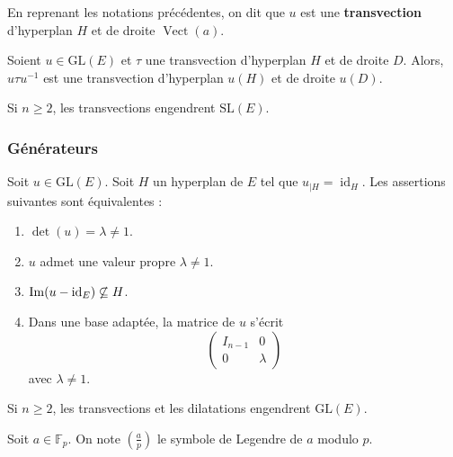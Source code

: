 	\begin{definition}
		En reprenant les notations précédentes, on dit que $u$ est une \textbf{transvection} d'hyperplan $H$ et de droite $\operatorname{Vect}(a)$.
	\end{definition}
	
	\begin{proposition}
		Soient $u \in \mathrm{GL}(E)$ et $\tau$ une transvection d'hyperplan $H$ et de droite $D$. Alors, $u \tau u^{-1}$ est une transvection d'hyperplan $u(H)$ et de droite $u(D)$.
	\end{proposition}
	
	\begin{theorem}
		Si $n \geq 2$, les transvections engendrent $\mathrm{SL}(E)$.
	\end{theorem}
	
	\subsubsection{Générateurs}
	
	
	\begin{proposition}
		Soit $u \in \mathrm{GL}(E)$. Soit $H$ un hyperplan de $E$ tel que $u_{|H} = \operatorname{id}_H$. Les assertions suivantes sont équivalentes :
		\begin{enumerate}[label=(\roman*)]
			\item $\det(u) = \lambda \neq 1$.
			\item $u$ admet une valeur propre $\lambda \neq 1$.
			\item $\mathrm{Im}(u - \operatorname{id}_E) \not\subseteq H$.
			\item Dans une base adaptée, la matrice de $u$ s'écrit
			\[
				\begin{pmatrix}
					I_{n-1} & 0 \\
					0 & \lambda
				\end{pmatrix}
			\]
			avec $\lambda \neq 1$.
		\end{enumerate}
	\end{proposition}
	
	\begin{theorem}
		Si $n \geq 2$, les transvections et les dilatations engendrent $\mathrm{GL}(E)$.
	\end{theorem}
	

	\begin{notation}
		Soit $a \in \mathbb{F}_p$. On note $\left( \frac{a}{p} \right)$ le symbole de Legendre de $a$ modulo $p$.
	\end{notation}
	
